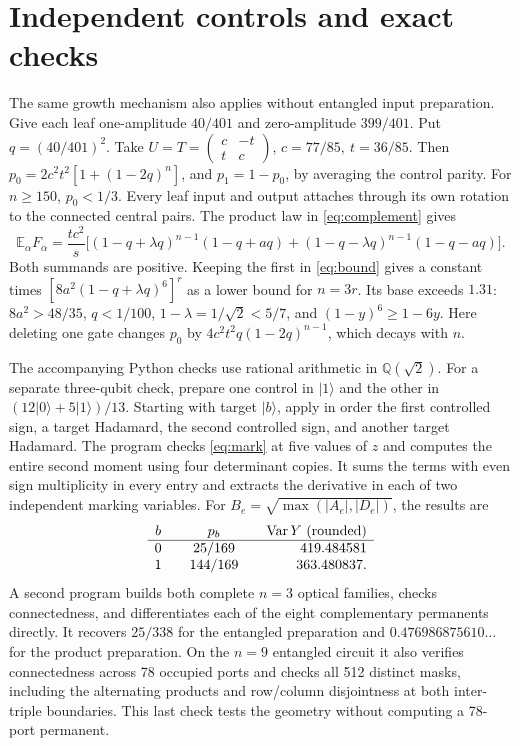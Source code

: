 \documentclass[11pt]{article}
\DeclareMathOperator{\Var}{Var}
\newcommand{\E}{\mathbb E}
\newcommand{\ket}[1]{\lvert #1\rangle}
\begin{document}
\section{Independent controls and exact checks}
The same growth mechanism also applies without entangled input preparation. Give each leaf one-amplitude \(40/401\) and zero-amplitude \(399/401\). Put \(q=(40/401)^2\). Take \(U=T=\left(\begin{smallmatrix}c&-t\\t&c\end{smallmatrix}\right)\), \(c=77/85,\ t=36/85\). Then \(p_0=2c^2t^2[1+(1-2q)^n]\), and \(p_1=1-p_0\), by averaging the control parity. For \(n\ge150\), \(p_0<1/3\). Every leaf input and output attaches through its own rotation to the connected central pairs. The product law in \eqref{eq:complement} gives
\[
 \E_\alpha F_\alpha=\frac{tc^2}{s}\big[(1-q+\lambda q)^{n-1}(1-q+aq)
                         +(1-q-\lambda q)^{n-1}(1-q-aq)\big].
\]
Both summands are positive. Keeping the first in \eqref{eq:bound} gives a constant times
\([8a^2(1-q+\lambda q)^6]^r\) as a lower bound for \(n=3r\).
Its base exceeds \(1.31\): \(8a^2>48/35\), \(q<1/100\), \(1-\lambda=1/\sqrt2<5/7\), and \((1-y)^6\ge1-6y\). Here deleting one gate changes \(p_0\) by \(4c^2t^2q(1-2q)^{n-1}\), which decays with \(n\).

The accompanying Python checks use rational arithmetic in \(\mathbb Q(\sqrt2)\). For a separate three-qubit check, prepare one control in \(\ket1\) and the other in \((12\ket0+5\ket1)/13\). Starting with target \(\ket b\), apply in order the first controlled sign, a target Hadamard, the second controlled sign, and another target Hadamard. The program checks \eqref{eq:mark} at five values of \(z\) and computes the entire second moment using four determinant copies. It sums the terms with even sign multiplicity in every entry and extracts the derivative in each of two independent marking variables. For \(B_e=\sqrt{\max(|A_e|,|D_e|)}\), the results are
\[
\begin{array}{c@{\qquad}c@{\qquad}r}
b & p_b & \Var Y\ \text{(rounded)}\\ \hline
0&25/169&419.484581\\
1&144/169&363.480837 .
\end{array}
\]
A second program builds both complete \(n=3\) optical families, checks connectedness, and differentiates each of the eight complementary permanents directly. It recovers \(25/338\) for the entangled preparation and \(0.476986875610\ldots\) for the product preparation. On the \(n=9\) entangled circuit it also verifies connectedness across 78 occupied ports and checks all 512 distinct masks, including the alternating products and row/column disjointness at both inter-triple boundaries. This last check tests the geometry without computing a 78-port permanent.
\end{document}

